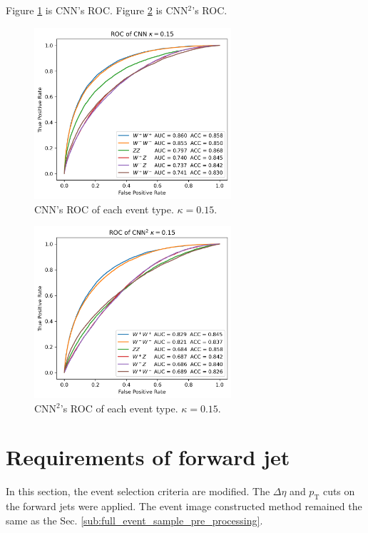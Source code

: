 \documentclass[12pt]{article}
\begin{document}
		Figure \ref{fig:CNN_event_roc_015} is CNN's ROC.  Figure \ref{fig:CNNsq_event_roc_015} is CNN${}^2$'s ROC.
		\begin{figure}[htpb]
			\centering
			\includegraphics[width=0.65\textwidth]{event_ROC_CNN_kappa0.15-1000k.png}
			\caption{CNN's ROC of each event type. $\kappa=0.15$.}
			\label{fig:CNN_event_roc_015}
		\end{figure}
		\begin{figure}[htpb]
			\centering
			\includegraphics[width=0.65\textwidth]{event_ROC_CNNsq_kappa0.15-1000k.png}
			\caption{CNN$^2$'s ROC of each event type. $\kappa=0.15$.}
			\label{fig:CNNsq_event_roc_015}
		\end{figure}
\section{Requirements of forward jet}%
\label{sec:requirements_of_forward_jet}
	In this section, the event selection criteria are modified. The $\Delta \eta$ and $p_\text{T}$ cuts on the forward jets were applied. The event image constructed method remained the same as the Sec. \ref{sub:full_event_sample_pre_processing}. 
\end{document}
